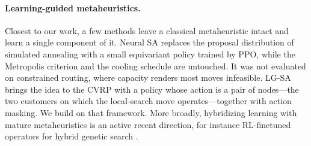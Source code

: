 \documentclass[letterpaper]{article} %
\begin{document}

\paragraph{Learning-guided metaheuristics.}
Closest to our work, a few methods leave a classical metaheuristic intact
and learn a single component of it. Neural SA \citep{correia_neural_2023}
replaces the proposal distribution of simulated annealing with a small
equivariant policy trained by PPO, while the Metropolis criterion and the cooling
schedule are untouched. It was not evaluated on constrained routing, where
capacity renders most moves infeasible. LG-SA \citep{AndrettiEtAl26} brings
the idea to the CVRP with a policy whose action is a pair of nodes---the two
customers on which the local-search move operates---together with action
masking. We build on that framework. More broadly, hybridizing learning with
mature metaheuristics is an active recent direction, for instance
RL-finetuned operators for hybrid genetic search \citep{zhu_refining_2025}.


\end{document}
